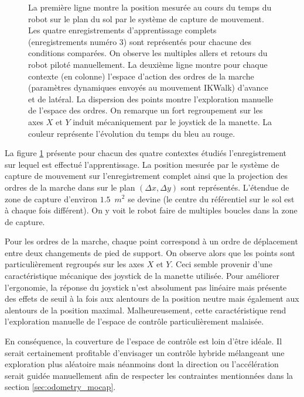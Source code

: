 \begin{figure}[htbp]
\begin{subfigure}{0.22\paperwidth}
    \end{subfigure}
    \caption{\label{fig:odometry_lwpr_logs} 
        La première ligne montre la position mesurée au cours du temps du robot 
        sur le plan du sol par le système de capture de mouvement.
        Les quatre enregistrements d'apprentissage complets (enregistrements numéro 3)
        sont représentés pour chacune des conditions comparées.
        On observe les multiples allers et retours du robot piloté manuellement.
        La deuxième ligne montre pour chaque contexte (en colonne) 
        l'espace d'action des ordres de la marche (paramètres dynamiques 
        envoyés au mouvement IKWalk) d'avance et de latéral.
        La dispersion des points montre l'exploration manuelle de l'espace des ordres.
        On remarque un fort regroupement sur les axes $X$ et $Y$ induit mécaniquement 
        par le joystick de la manette.
        La couleur représente l'évolution du temps du bleu au rouge.
    }
\end{figure}

La figure \ref{fig:odometry_lwpr_logs} présente pour chacun des quatre 
contextes étudiés l'enregistrement sur lequel est effectué l'apprentissage.
La position mesurée par le système de capture de mouvement sur l'enregistrement complet
ainsi que la projection des ordres de la marche dans sur le 
plan $(\Delta x, \Delta y)$ sont représentés.
L'étendue de zone de capture d'environ $1.5$~$m^2$ se devine (le centre du référentiel 
sur le sol est à chaque fois différent).
On y voit le robot faire de multiples boucles dans la zone de capture.

Pour les ordres de la marche, chaque point correspond à un ordre de déplacement 
entre deux changements de pied de support.
On observe alors que les points sont particulièrement regroupés sur les axes $X$ et $Y$.
Ceci semble provenir d'une caractéristique mécanique des joystick de la manette utilisée.
Pour améliorer l'ergonomie, la réponse du joystick n'est absolument pas linéaire mais
présente des effets de seuil à la fois aux alentours de la position neutre mais également 
aux alentours de la position maximal.
Malheureusement, cette caractéristique rend l'exploration manuelle de l'espace de
contrôle particulièrement malaisée.

En conséquence, la couverture de l'espace de contrôle est loin d'être idéale.
Il serait certainement profitable d'envisager un contrôle hybride mélangeant une exploration
plus aléatoire mais néanmoins dont la direction ou l'accélération serait guidée manuellement
afin de respecter les contraintes mentionnées dans la section \ref{sec:odometry_mocap}.

